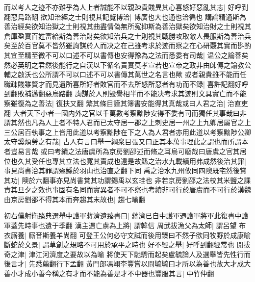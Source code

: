 而以考人之迹不亦難乎為人上者誠能不以親疎貴賤異其心喜怒好惡亂其志|{
	好呼到翻惡烏路翻}
欲知治經之士則視其記覽博洽|{
	博廣也大也通也洽徧也}
講論精通斯為善治經矣欲知治獄之士則視其曲盡情偽無所寃抑斯為善治獄矣欲知治財之士則視其倉庫盈實百姓富給斯為善治財矣欲知治兵之士則視其戰勝攻取敵人畏服斯為善治兵矣至於百官莫不皆然雖詢謀於人而决之在己雖考求於迹而察之在心研覈其實而斟酌其宜至精至微不可以口述不可以書傳也安得豫為之法而悉委有司哉|{
	温公之論善矣然必英明之君然後能行之自漢以下循名責實莫孝宣若也宣帝之政非由師傅之諭教公輔之啟沃也公所謂不可以口述不可以書傳其萬世之名言也歟}
或者親貴雖不能而任職疎賤雖賢才而見遺所喜所好者敗官而不去所怒所惡者有功而不録|{
	喜許記翻好呼到翻敗補邁翻惡烏路翻}
詢謀於人則毁譽相半而不能决考求其迹則文具實亡而不能察雖復為之善法|{
	復扶又翻}
繁其條目謹其簿書安能得其真哉或曰人君之治|{
	治直吏翻}
大者天下小者一國内外之官以千萬數考察黜陟安得不委有司而獨任其事哉曰非謂其然也凡為人上者不特人君而已太守居一郡之上刺史居一州之上九卿居屬官之上三公居百執事之上皆用此道以考察黜陟在下之人為人君者亦用此道以考察黜陟公卿太守奚煩勞之有哉|{
	古人有言曰舉一綱衆目張又曰正其本萬事理此之謂也而所謂本者豈易言哉}
或曰考績之法唐虞所為京房劉邵述而脩之耳烏可廢哉曰唐虞之官其居位也久其受任也專其立法也寛其責成也遠是故鯀之治水九載績用弗成然後治其罪|{
	事見尚書治其罪謂殛鯀於羽山也治直之翻下同}
禹之治水九州攸同四隩既宅然後賞其功|{
	隩於六翻事亦見尚書賞其功謂錫禹以玄珪也}
非若京房劉邵之法校其米鹽之課責其旦夕之效也事固有名同而實異者不可不察也考績非可行於唐虞而不可行於漢魏由京房劉邵不得其本而奔趨其末故也|{
	趨七喻翻}


初右僕射衛臻典選舉中護軍蔣濟遺臻書曰|{
	蔣濟已自中護軍遷護軍將軍此復書中護軍蓋先時事也遺于季翻}
漢主遇亡虜為上將|{
	謂韓信}
周武拔漁父為太師|{
	謂呂望}
布衣厮養|{
	厮音斯養羊尚翻}
可登王公何必守文試而後用臻曰不然子欲同牧野於成康喻斷蛇於文景|{
	謂草創之規略不可用於承平之時也}
好不經之舉|{
	好呼到翻經常也}
開拔奇之津|{
	津江河濟度之要故以為喻}
將使天下馳騁而起矣盧毓論人及選舉皆先性行而後言才|{
	先悉薦翻行下孟翻}
黃門郎馮翊李豐嘗以問毓毓曰才所以為善也故大才成大善小才成小善今稱之有才而不能為善是才不中器也豐服其言|{
	中竹仲翻}


